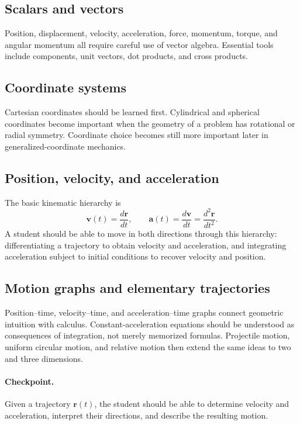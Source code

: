 \subsection*{Scalars and vectors}

Position, displacement, velocity, acceleration, force, momentum, torque, and angular momentum all
require careful use of vector algebra.  Essential tools include components, unit vectors, dot
products, and cross products.

\subsection*{Coordinate systems}

Cartesian coordinates should be learned first.  Cylindrical and spherical coordinates become
important when the geometry of a problem has rotational or radial symmetry.  Coordinate choice
becomes still more important later in generalized-coordinate mechanics.

\subsection*{Position, velocity, and acceleration}

The basic kinematic hierarchy is
\[
\mathbf{v}(t)=\frac{d\mathbf{r}}{dt},
\qquad
\mathbf{a}(t)=\frac{d\mathbf{v}}{dt}
             =\frac{d^2\mathbf{r}}{dt^2}.
\]
A student should be able to move in both directions through this hierarchy: differentiating a
trajectory to obtain velocity and acceleration, and integrating acceleration subject to initial
conditions to recover velocity and position.

\subsection*{Motion graphs and elementary trajectories}

Position--time, velocity--time, and acceleration--time graphs connect geometric intuition with
calculus.  Constant-acceleration equations should be understood as consequences of integration,
not merely memorized formulas.  Projectile motion, uniform circular motion, and relative motion
then extend the same ideas to two and three dimensions.

\paragraph{Checkpoint.}
Given a trajectory $\mathbf{r}(t)$, the student should be able to determine velocity and
acceleration, interpret their directions, and describe the resulting motion.

